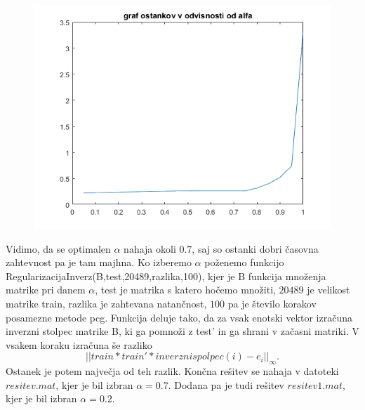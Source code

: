 \documentclass[11pt]{article} %
\begin{document}
\begin{figure}[ht]
\centering
\begin{minipage}{.5\textwidth}
\centering
\includegraphics[scale=0.5]{ostanek}
\end{minipage}%
\end{figure}


Vidimo, da se optimalen $\alpha$ nahaja okoli $0.7$, saj so ostanki dobri časovna zahtevnost pa je tam majhna. Ko izberemo $\alpha$ poženemo funkcijo RegularizacijaInverz(B,test,20489,razlika,100), kjer je B funkcija množenja matrike pri danem $\alpha$, test je matrika s katero hočemo množiti, $20489$ je velikost matrike train, razlika je zahtevana natančnost, $100$ pa je število korakov posamezne metode pcg. Funkcija deluje tako, da za vsak enotski vektor izračuna inverzni stolpec matrike B, ki ga pomnoži z test' in ga shrani v začasni matriki. V vsakem koraku izračuna še razliko
$$||train*train'*inverznispolpec(i) - e_i||_{\infty}.$$
Ostanek je potem največja od teh razlik. Končna rešitev se nahaja v datoteki $resitev.mat$, kjer je bil izbran $\alpha=0.7$. Dodana pa je tudi rešitev $resitev1.mat$, kjer je bil izbran $\alpha=0.2$.
\end{document}
